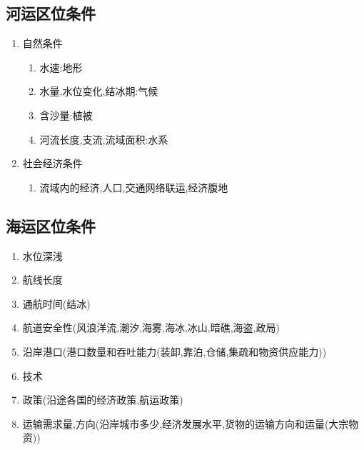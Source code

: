 \documentclass[a4paper]{article}
\begin{document}
    \subsection{河运区位条件}
    \begin{enumerate}
        \item 自然条件
        \begin{enumerate}
            \item 水速:地形
            \item 水量,水位变化,结冰期:气候
            \item 含沙量:植被
            \item 河流长度,支流,流域面积:水系
        \end{enumerate}
        \item 社会经济条件
        \begin{enumerate}
            \item 流域内的经济,人口,交通网络联运,经济腹地
        \end{enumerate}
    \end{enumerate}
    \subsection{海运区位条件}
    \begin{enumerate}
        \item 水位深浅
        \item 航线长度
        \item 通航时间(结冰)
        \item 航道安全性(风浪洋流,潮汐,海雾,海冰,冰山,暗礁,海盗,政局)
        \item 沿岸港口(港口数量和吞吐能力(装卸,靠泊,仓储,集疏和物资供应能力))
        \item 技术
        \item 政策(沿途各国的经济政策,航运政策)
        \item 运输需求量,方向(沿岸城市多少,经济发展水平,货物的运输方向和运量(大宗物资))
    \end{enumerate}
\end{document}
